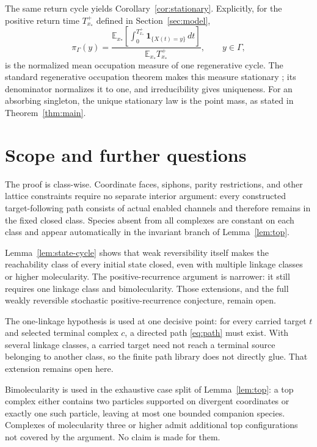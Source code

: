 The same return cycle yields Corollary~\ref{cor:stationary}.  Explicitly, for
the positive return time \(T_{x_*}^+\) defined in Section~\ref{sec:model},
\begin{equation}\label{eq:occupation-formula}
 \pi_\Gamma(y)=
 \frac{\displaystyle
   \mathbb E_{x_*}\!\left[\int_0^{T_{x_*}^+}
      \mathbf1_{\{X(t)=y\}}\,dt\right]}
 {\mathbb E_{x_*}T_{x_*}^+},
 \qquad y\in\Gamma,
\end{equation}
is the normalized mean occupation measure of one regenerative cycle.  The
standard regenerative occupation theorem makes this measure stationary
\citep{Asmussen2003}; its denominator normalizes it to one, and irreducibility
gives uniqueness.  For an absorbing singleton, the unique stationary law is
the point mass, as stated in Theorem~\ref{thm:main}.

\section{Scope and further questions}\label{sec:scope}

The proof is class-wise.  Coordinate faces, siphons, parity restrictions, and
other lattice constraints require no separate interior argument: every
constructed target-following path consists of actual enabled channels and
therefore remains in the fixed closed class.  Species absent from all
complexes are constant on each class and appear automatically in the
invariant branch of Lemma~\ref{lem:top}.

Lemma~\ref{lem:state-cycle} shows that weak reversibility itself makes the
reachability class of every initial state closed, even with multiple linkage
classes or higher molecularity.  The positive-recurrence argument is narrower:
it still requires one linkage class and bimolecularity.  Those extensions, and
the full weakly reversible stochastic positive-recurrence conjecture, remain
open.

The one-linkage hypothesis is used at one decisive point: for every carried
target \(t\) and selected terminal complex \(c\), a directed path
\eqref{eq:path} must exist.  With several linkage classes, a carried target
need not reach a terminal source belonging to another class, so the finite
path library does not directly glue.  That extension remains open here.

Bimolecularity is used in the exhaustive case split of
Lemma~\ref{lem:top}: a top complex either contains two particles supported on
divergent coordinates or exactly one such particle, leaving at most one
bounded companion species.  Complexes of molecularity three or higher admit
additional top configurations not covered by the argument.  No claim is made
for them.

